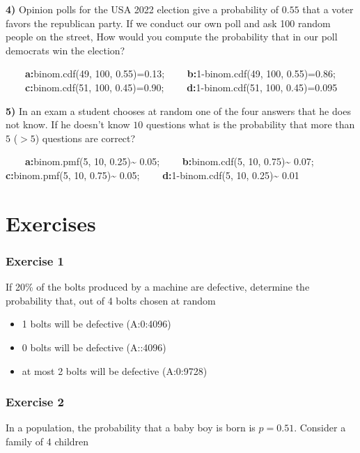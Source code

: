 \documentclass[
]{book}
\providecommand{\tightlist}{%
  \setlength{\itemsep}{0pt}\setlength{\parskip}{0pt}}
\begin{document}
\textbf{4)} Opinion polls for the USA 2022 election give a probability of \(0.55\) that a voter favors the republican party. If we conduct our own poll and ask 100 random people on the street, How would you compute the probability that in our poll democrats win the election?

\textbf{\(\qquad\)a:}binom.cdf(49, 100, 0.55)=0.13;
\textbf{\(\qquad\)b:}1-binom.cdf(49, 100, 0.55)=0.86;
\textbf{\(\qquad\)c:}binom.cdf(51, 100, 0.45)=0.90; \textbf{\(\qquad\)d:}1-binom.cdf(51, 100, 0.45)=0.095

\textbf{5)} In an exam a student chooses at random one of the four answers that he does not know. If he doesn't know \(10\) questions what is the probability that more than \(5\) (\(>5\)) questions are correct?

\textbf{\(\qquad\)a:}binom.pmf(5, 10, 0.25)\textasciitilde{} 0.05; \textbf{\(\qquad\)b:}binom.cdf(5, 10, 0.75)\textasciitilde{} 0.07; \textbf{\(\qquad\)c:}binom.pmf(5, 10, 0.75)\textasciitilde{} 0.05; \textbf{\(\qquad\)d:}1-binom.cdf(5, 10, 0.25)\textasciitilde{} 0.01

\hypertarget{exercises-5}{%
\section{Exercises}\label{exercises-5}}

\hypertarget{exercise-1-4}{%
\subsubsection{Exercise 1}\label{exercise-1-4}}

If 20\% of the bolts produced by a machine are defective, determine the probability that, out of
4 bolts chosen at random

\begin{itemize}
\tightlist
\item
  1 bolts will be defective (A:0:4096)
\item
  0 bolts will be defective (A::4096)
\item
  at most 2 bolts will be defective (A:0:9728)
\end{itemize}

\hypertarget{exercise-2-4}{%
\subsubsection{Exercise 2}\label{exercise-2-4}}

In a population, the probability that a baby boy is born is \(p=0.51\). Consider a family of 4 children
\end{document}
